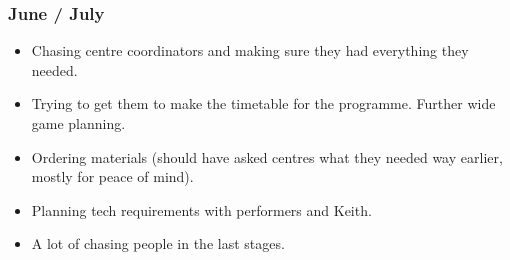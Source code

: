 \subsubsection{June / July}
\begin{itemize}
    \item Chasing centre coordinators and making sure they had everything they needed.
    \item Trying to get them to make the timetable for the programme. Further wide game planning.
    \item Ordering materials (should have asked centres what they needed way earlier, mostly for peace of mind).
    \item Planning tech requirements with performers and Keith.
    \item A lot of chasing people in the last stages.
\end{itemize}